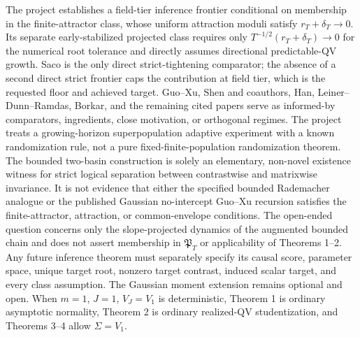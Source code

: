 \documentclass{article}
\begin{document}
The project establishes a field-tier inference frontier conditional on membership in the finite-attractor class, whose uniform attraction moduli satisfy \(r_T+\delta_T\to0\). Its separate early-stabilized projected class requires only \(T^{-1/2}(r_T+\delta_T)\to0\) for the numerical root tolerance and directly assumes directional predictable-QV growth. Saco is the only direct strict-tightening comparator; the absence of a second direct strict frontier caps the contribution at field tier, which is the requested floor and achieved target. Guo--Xu, Shen and coauthors, Han, Leiner--Dunn--Ramdas, Borkar, and the remaining cited papers serve as informed-by comparators, ingredients, close motivation, or orthogonal regimes. The project treats a growing-horizon superpopulation adaptive experiment with a known randomization rule, not a pure fixed-finite-population randomization theorem. The bounded two-basin construction is solely an elementary, non-novel existence witness for strict logical separation between contrastwise and matrixwise invariance. It is not evidence that either the specified bounded Rademacher analogue or the published Gaussian no-intercept Guo--Xu recursion satisfies the finite-attractor, attraction, or common-envelope conditions. The open-ended question concerns only the slope-projected dynamics of the augmented bounded chain and does not assert membership in \(\mathfrak P_T\) or applicability of Theorems 1--2. Any future inference theorem must separately specify its causal score, parameter space, unique target root, nonzero target contrast, induced scalar target, and every class assumption. The Gaussian moment extension remains optional and open. When \(m=1\), \(J=1\), \(V_J=V_1\) is deterministic, Theorem 1 is ordinary asymptotic normality, Theorem 2 is ordinary realized-QV studentization, and Theorems 3--4 allow \(\Sigma=V_1\).
\end{document}
